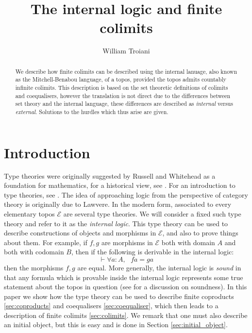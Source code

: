 \documentclass{birkjour}
\title[The internal logic and finite colimits]
{The internal logic and finite colimits}
\author[William Troiani]{William Troiani}
\theoremstyle{plain}
\theoremstyle{definition}
\newcommand{\call}[1]{\mathcal{#1}}
\begin{document}
	
	\maketitle
	
	\begin{abstract}
		We describe how finite colimits can be described using the internal lanuage, also known as the Mitchell-Benabou language, of a topos, provided the topos admits countably infinite colimits. This description is based on the set theoretic definitions of colimits and coequalisers, however the translation is not direct due to the differences between set theory and the internal language, these differences are described as \emph{internal} versus \emph{external}. Solutions to the hurdles which thus arise are given.
	\end{abstract}
	
	\tableofcontents
	
	
	\section{Introduction}
	Type theories were originally suggested by Russell and Whitehead \cite{russell} as a foundation for mathematics, for a historical view, see \cite[p.124]{lambekscott}. For an introduction to type theories, see \cite[\S 3.3]{su}. The idea of approaching logic from the perspective of category theory is originally due to Lawvere. In the modern form, associated to every elementary topos $\call{E}$ are several type theories. We will consider a fixed such type theory and refer to it as the \emph{internal logic}. This type theory can be used to describe constructions of objects and morphisms in $\call{E}$, and also to prove things about them. For example, if $f,g$ are morphisms in $\call{E}$ both with domain $A$ and both with codomain $B$, then if the following is derivable in the internal logic:
	\begin{equation}
		\vdash \forall a:A,\text{ }fa = ga
	\end{equation}
	then the morphisms $f,g$ are equal. More generally, the internal logic is \emph{sound} in that any formula which is provable inside the internal logic represents some true statement about the topos in question (see \cite[\S D1.3.2, D4.2.3, D4.3.3, D4.4.6]{Johnstone} for a discussion on soundness). In this paper we show how the type theory can be used to describe finite coproducts \ref{sec:coproducts} and coequalisers \ref{sec:coequaliser}, which then leads to a description of finite colimits \ref{sec:colimits}. We remark that one must also describe an initial object, but this is easy and is done in Section \ref{sec:initial_object}.
	
\end{document}
